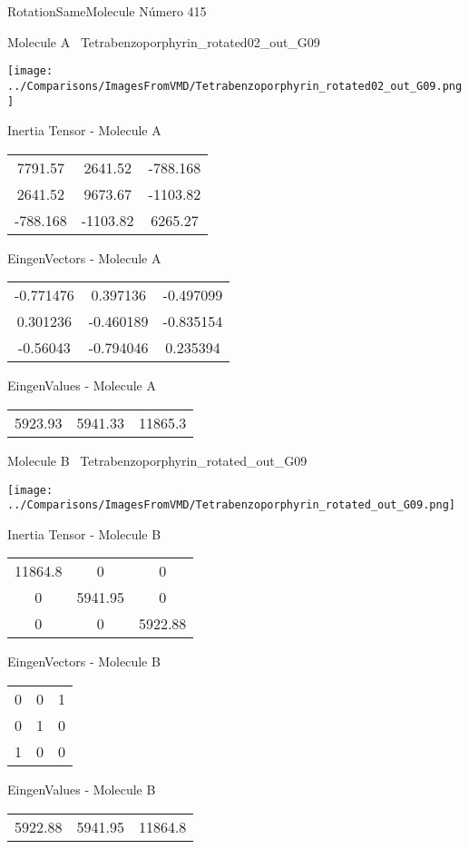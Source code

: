 \vtab[-3cm]
\begin{center}
{\large RotationSameMolecule \tab Número 415}
\end{center}
\begin{multicols}{2}
\begin{center}

Molecule A \
Tetrabenzoporphyrin\_rotated02\_out\_G09

\texttt{[image: ../Comparisons/ImagesFromVMD/Tetrabenzoporphyrin\_rotated02\_out\_G09.png]}

Inertia Tensor - Molecule A \\
\begin{tabular}{|c c c|}
7791.57	 & 	2641.52	 & 	-788.168	 \\
2641.52	 & 	9673.67	 & 	-1103.82	 \\
-788.168	 & 	-1103.82	 & 	6265.27
\end{tabular}

\vtab
 EingenVectors - Molecule A     \\
\begin{tabular}{|c c c|}
-0.771476	 & 	0.397136	 & 	-0.497099	 \\
0.301236	 & 	-0.460189	 & 	-0.835154	 \\
-0.56043	 & 	-0.794046	 & 	0.235394
\end{tabular}

\vtab
 EingenValues - Molecule A     \\
\begin{tabular}{|c c c|}
5923.93	 & 	5941.33	 & 	11865.3	 \\
\end{tabular}
\columnbreak

Molecule B \
Tetrabenzoporphyrin\_rotated\_out\_G09

\texttt{[image: ../Comparisons/ImagesFromVMD/Tetrabenzoporphyrin\_rotated\_out\_G09.png]}

Inertia Tensor - Molecule B \\
\begin{tabular}{|c c c|}
11864.8	 & 	0	 & 	0	 \\
0	 & 	5941.95	 & 	0	 \\
0	 & 	0	 & 	5922.88
\end{tabular}

\vtab
 EingenVectors - Molecule B     \\
\begin{tabular}{|c c c|}
0	 & 	0	 & 	1	 \\
0	 & 	1	 & 	0	 \\
1	 & 	0	 & 	0
\end{tabular}

\vtab
 EingenValues - Molecule B     \\
\begin{tabular}{|c c c|}
5922.88	 & 	5941.95	 & 	11864.8	 \\
\end{tabular}

\end{center}
\end{multicols}

